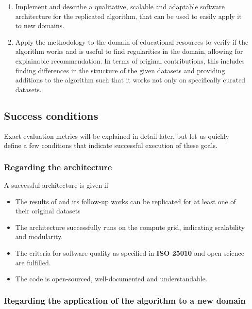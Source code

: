 \begin{enumerate}
    \item Implement and describe a qualitative, scalable and adaptable software architecture for the replicated algorithm, that can be used to easily apply it to new domains.
    \item Apply the methodology to the domain of educational resources to verify if the algorithm works and is useful to find regularities in the domain, allowing for explainable recommendation. In terms of original contributions, this includes finding differences in the structure of the given datasets and providing additions to the algorithm such that it works not only on specifically curated datasets.
\end{enumerate}

\subsection{Success conditions}

Exact evaluation metrics will be explained in detail later, but let us quickly define a few conditions that indicate successful execution of these goals.

\subsubsection*{Regarding the architecture}

A successful architecture is given if 

\begin{itemize}
    \item The results of \cite{Derrac2015} and its follow-up works \cite{Ager2018,Alshaikh2020} can be replicated for at least one of their original datasets
    \item The architecture successfully runs on the compute grid, indicating scalability and modularity.
    \item The criteria for software quality as specified in \textbf{ISO 25010} and open science are fulfilled.
    \item The code is open-sourced, well-documented and understandable.
\end{itemize}

\subsubsection*{Regarding the application of the algorithm to a new domain}

